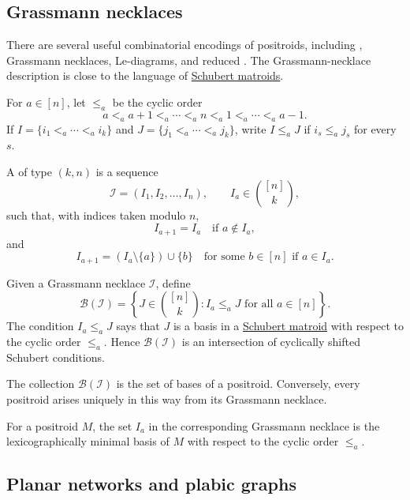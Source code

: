 \subsection[positroidGrassmannNecklace]{Grassmann necklaces}

There are several useful combinatorial encodings of positroids, including
, Grassmann necklaces, Le-diagrams, and reduced
\label{plabicGraphDefinition}.  The Grassmann-necklace
description is close to the language of
\hyperref[schubertMatroidDefinition]{Schubert matroids}.

For $a\in [n]$, let $\leq_a$ be the cyclic order
\[
  a \lt_a a+1 \lt_a \dotsb \lt_a n \lt_a 1 \lt_a \dotsb \lt_a a-1.
\]
If $I=\{i_1\lt_a \dotsb \lt_a i_k\}$ and
$J=\{j_1\lt_a \dotsb \lt_a j_k\}$, write $I\leq_a J$ if
$i_s\leq_a j_s$ for every $s$.

A \label{grassmannNecklaceDefinition} of type
$(k,n)$ is a sequence
\[
  \mathcal{I}=(I_1,I_2,\dotsc,I_n),
  \qquad I_a\in \binom{[n]}{k},
\]
such that, with indices taken modulo $n$,
\[
  I_{a+1}=I_a \quad \text{if } a\notin I_a,
\]
and
\[
  I_{a+1}=(I_a\setminus \{a\})\cup \{b\}
  \quad \text{for some } b\in [n] \text{ if } a\in I_a.
\]

Given a Grassmann necklace $\mathcal{I}$, define
\[
  \mathcal{B}(\mathcal{I})
  =
  \left\{
    J\in \binom{[n]}{k} :
    I_a \leq_a J \text{ for all } a\in [n]
  \right\}.
\]
The condition $I_a\leq_a J$ says that $J$ is a basis in a
\hyperref[schubertMatroidDefinition]{Schubert matroid} with respect to the
cyclic order $\leq_a$.  Hence
$\mathcal{B}(\mathcal{I})$ is an intersection of cyclically shifted Schubert
conditions.

\begin{theorem}
The collection $\mathcal{B}(\mathcal{I})$ is the set of bases of a positroid.
Conversely, every positroid arises uniquely in this way from its Grassmann
necklace.
\end{theorem}

For a positroid $M$, the set $I_a$ in the corresponding Grassmann necklace is
the lexicographically minimal basis of $M$ with respect to the cyclic order
$\leq_a$.


\subsection[positroidNetworks]{Planar networks and plabic graphs}

